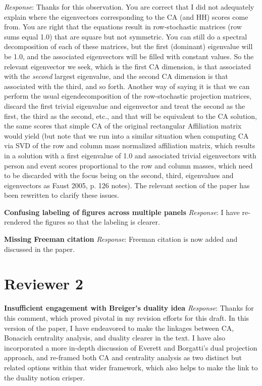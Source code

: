 \documentclass{article}
\begin{document}
\noindent \textit{Response}: Thanks for this observation. You are correct that I did not adequately explain where the eigenvectors corresponding to the CA (and HH) scores come from. You are right that the equations result in row-stochastic matrices (row sums equal 1.0) that are square but not symmetric. You can still do a spectral decomposition of each of these matrices, but the first (dominant) eigenvalue will be 1.0, and the associated eigenvectors will be filled with constant values. So the relevant eigenvector we seek, which is the first CA dimension, is that associated with the \textit{second} largest eigenvalue, and the second CA dimension is that associated with the third, and so forth. Another way of saying it is that we can perform the usual eigendecomposition of the row-stochastic projection matrices, discard the first trivial eigenvalue and eigenvector and treat the second as the first, the third as the second, etc., and that will be equivalent to the CA solution, the same scores that simple CA of the original rectangular Affiliation matrix would yield (but note that we run into a similar situation when computing CA via SVD of the row and column mass normalized affiliation matrix, which results in a solution with a first eigenvalue of 1.0 and associated trivial eigenvectors with person and event scores proportional to the row and column masses, which need to be discarded with the focus being on the second, third, eigenvalues and eigenvectors as Faust 2005, p. 126 notes). The relevant section of the paper has been rewritten to clarify these issues.\newline

\noindent\textbf{Confusing labeling of figures across multiple panels}\newline
\textit{Response}: I have re-rendered the figures so that the labeling is clearer. \newline

\noindent\textbf{Missing Freeman citation}\newline
\textit{Response}: Freeman citation is now added and discussed in the paper. \newline

\newpage
\section*{Reviewer 2}

\textbf{Insufficient engagement with Breiger's duality idea}\newline
\textit{Response}: Thanks for this comment, which proved pivotal in my revision efforts for this draft. In this version of the paper, I have endeavored to make the linkages between CA, Bonacich centrality analysis, and duality clearer in the text. I have also incorporated a more in-depth discussion of Everett and Borgatti's dual projection approach, and re-framed both CA and centrality analysis as two distinct but related options within that wider framework, which also helps to make the link to the duality notion crisper. \newline
\end{document}
